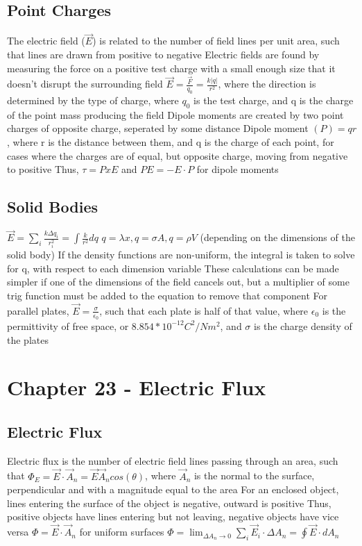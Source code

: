 \documentclass[11 pt, twoside]{article}
\newenvironment{outline*}
{
	\begin{outline}[enumerate]
	}
	{\end{outline}
}
\begin{document}
\subsection{Point Charges}
\begin{outline*}
\1 The electric field ($\vec{E}$) is related to the number of field lines per unit area, such that lines are drawn from positive to negative
\2 Electric fields are found by measuring the force on a positive test charge with a small enough size that it doesn't disrupt the surrounding field
\2 $\vec{E} = \frac{\vec{F}}{q_0} = \frac{k|q|}{r^2}$, where the direction is determined by the type of charge, where $q_0$ is the test charge, and q is the charge of the point mass producing the field
\1 Dipole moments are created by two point charges of opposite charge, seperated by some distance
\2 Dipole moment $(P) = qr$, where r is the distance between them, and q is the charge of each point, for cases where the charges are of equal, but opposite charge, moving from negative to positive
\2 Thus, $\tau = P x E$ and $PE = -E \cdot P$ for dipole moments
\end{outline*}
\subsection{Solid Bodies}
\begin{outline*}
\1 $\vec{E} = \sum_i \frac{k\Delta q_i}{r_i^2} = \int \frac{k}{r^2}dq$
\2 $q = \lambda x, q = \sigma A, q = \rho V$ (depending on the dimensions of the solid body)
\2 If the density functions are non-uniform, the integral is taken to solve for q, with respect to each dimension variable 
\1 These calculations can be made simpler if one of the dimensions of the field cancels out, but a multiplier of some trig function must be added to the equation to remove that component
\1 For parallel plates, $\vec{E} = \frac{\sigma}{\epsilon_0}$, such that each plate is half of that value, where $\epsilon_0$ is the permittivity of free space, or $8.854 * 10^{-12} C^2/Nm^2$, and $\sigma$ is the charge density of the plates
\end{outline*}

\section{Chapter 23 - Electric Flux}
\subsection{Electric Flux}
\begin{outline*}
\1 Electric flux is the number of electric field lines passing through an area, such that $\Phi_E = \vec{E} \cdot \vec{A}_n = \vec{E}\vec{A}_ncos(\theta)$, where $\vec{A}_n$ is the normal to the surface, perpendicular and with a magnitude equal to the area
\2 For an enclosed object, lines entering the surface of the object is negative, outward is positive
\2 Thus, positive objects have lines entering but not leaving, negative objects have vice versa 
\1 $\Phi = \vec{E} \cdot \vec{A}_n$ for uniform surfaces
\2 $\Phi = \lim_{\Delta A_n \to 0} \sum_i \vec{E}_i \cdot \Delta A_n = \oint \vec{E} \cdot dA_n$
\end{outline*}
\end{document}
